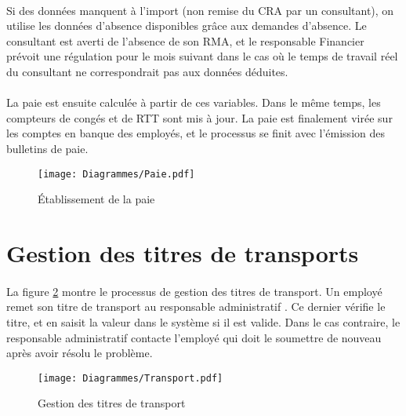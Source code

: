 \paragraph{} Si des données manquent à l'import (non remise du CRA par un consultant), on utilise les données d'absence disponibles grâce aux demandes d'absence. Le consultant est averti de l'absence de son RMA, et le responsable Financier prévoit une régulation pour le mois suivant dans le cas où le temps de travail réel du consultant ne correspondrait pas aux données déduites.

\paragraph{} La paie est ensuite calculée à partir de ces variables. Dans le même temps, les compteurs de congés et de RTT sont mis à jour. La paie est finalement virée sur les comptes en banque des employés, et le processus se finit avec l'émission des bulletins de paie.

\begin{figure}[H]
\centering
\begin{sideways}
	\texttt{[image: Diagrammes/Paie.pdf]}
\end{sideways}
	\caption{Établissement de la paie} 
	\label{paie}
\end{figure}


\section{Gestion des titres de transports}

\paragraph{} La figure \ref{transports} montre le processus de gestion des titres de transport. Un employé remet son titre de transport au responsable administratif . Ce dernier vérifie le titre, et en saisit la valeur dans le système si il est valide. Dans le cas contraire, le responsable administratif contacte l'employé qui doit le soumettre de nouveau après avoir résolu le problème.

\begin{figure}[H]
\centering
	\texttt{[image: Diagrammes/Transport.pdf]}
	\caption{Gestion des titres de transport} 
	\label{transports}
\end{figure}


